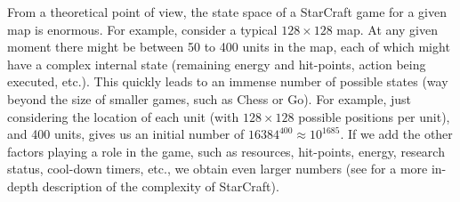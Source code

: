 \documentclass{llncs}
\begin{document}


From a theoretical point of view,  the state space of a StarCraft game
for a  given map is  enormous.  For  example, consider a  typical $128
\times 128$ map. At any given moment  there might be between 50 to 400
units in  the map, each of  which might have a  complex internal state
(remaining energy  and hit-points, action being  executed, etc.). This
quickly leads to an immense number  of possible states (way beyond the
size  of smaller  games,  such  as Chess  or  Go).  For example,  just
considering the location of each  unit (with $128 \times 128$ possible
positions per  unit), and  400 units,  gives us  an initial  number of
$16384^{400} \approx 10^{1685}$. If we add the other factors playing a
role in the game, such as resources, hit-points, energy, research status, cool-down timers, etc., we obtain even larger numbers (see \cite{ontanon2013survey} for a more in-depth description of the complexity of StarCraft).
\end{document}
